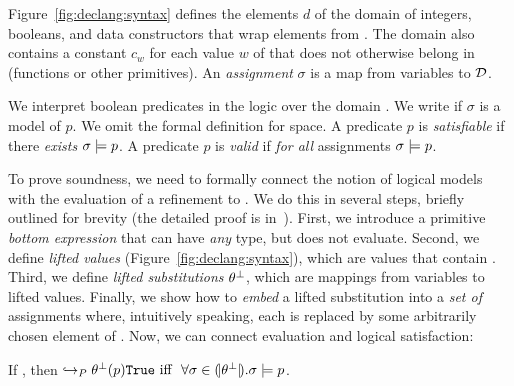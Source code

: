 Figure~\ref{fig:declang:syntax} defines the elements $d$
of the domain \dom 
of integers, booleans, and data constructors that wrap
elements from \dom.
%
The domain \dom also contains a constant $c_w$
for each value $w$ of \undeclang that does 
not otherwise belong in \dom (\eg functions or other primitives).
%
An \emph{assignment} $\sigma$ is a map from variables 
to $\mathcal{D}$.

We interpret boolean predicates in the logic over the domain 
\dom.
%
We write  %
if $\sigma$ is a model of $p$.
%
We omit the formal definition for space.
%
A predicate $p$ is \emph{satisfiable}  %
if there \emph{exists} $\sigma \models p$. %
%
A predicate $p$ is \emph{valid} %
if \emph{for all} assignments $\sigma \models p$. %
%



To prove soundness, we need to formally connect the
notion of logical models with the evaluation of a 
refinement to \etrue.
%
We do this in several steps, briefly outlined for brevity
(the detailed proof is in~\cite{vazou14techrep}).
%
First, we introduce a primitive \emph{bottom expression} 
\ebot that can have \emph{any} \Div type, but does not evaluate.
%
Second, we define \emph{lifted values} \botv 
(Figure~\ref{fig:declang:syntax}), which are values that
contain \ebot.
%
Third, we define \emph{lifted substitutions} 
$\theta^\perp$, which are mappings from variables to 
lifted values.
%
Finally, we show how to \emph{embed} a lifted substitution 
\botsto into a \emph{set of} assignments \embed{\botsto} 
where, intuitively speaking, each \ebot is replaced by
some arbitrarily chosen element of \dom.
%
Now, we can connect evaluation and logical satisfaction:
%
\begin{theorem}\label{thm:equiv}
If , then
$\evals{\botsto(p)}{\etrue}\ 
\mbox{iff}\ \ 
\forall \sigma \in \embed{\botsto}. \lmodels{\sigma}{p}$.
\end{theorem}

